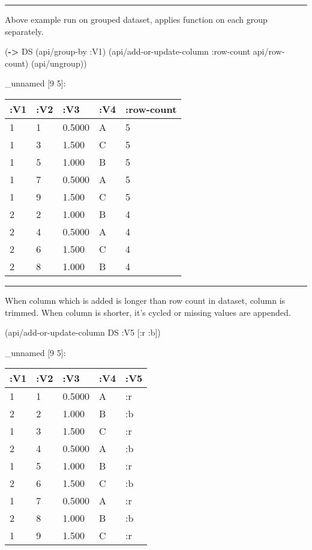 \documentclass[]{article}
\newenvironment{Shaded}{\begin{snugshade}}{\end{snugshade}}
\newcommand{\KeywordTok}[1]{\textcolor[rgb]{0.13,0.29,0.53}{\textbf{#1}}}
\newcommand{\AttributeTok}[1]{\textcolor[rgb]{0.77,0.63,0.00}{#1}}
\newcommand{\NormalTok}[1]{#1}
\begin{document}
\begin{center}\rule{0.5\linewidth}{0.5pt}\end{center}

Above example run on grouped dataset, applies function on each group
separately.

\begin{Shaded}
\begin{Highlighting}[]
\NormalTok{(}\KeywordTok{->}\NormalTok{ DS}
\NormalTok{    (api/group-by }\AttributeTok{:V1}\NormalTok{)}
\NormalTok{    (api/add-or-update-column }\AttributeTok{:row-count}\NormalTok{ api/row-count)}
\NormalTok{    (api/ungroup))}
\end{Highlighting}
\end{Shaded}

\_unnamed {[}9 5{]}:

\begin{longtable}[]{@{}lllll@{}}
\toprule
:V1 & :V2 & :V3 & :V4 & :row-count\tabularnewline
\midrule
\endhead
1 & 1 & 0.5000 & A & 5\tabularnewline
1 & 3 & 1.500 & C & 5\tabularnewline
1 & 5 & 1.000 & B & 5\tabularnewline
1 & 7 & 0.5000 & A & 5\tabularnewline
1 & 9 & 1.500 & C & 5\tabularnewline
2 & 2 & 1.000 & B & 4\tabularnewline
2 & 4 & 0.5000 & A & 4\tabularnewline
2 & 6 & 1.500 & C & 4\tabularnewline
2 & 8 & 1.000 & B & 4\tabularnewline
\bottomrule
\end{longtable}

\begin{center}\rule{0.5\linewidth}{0.5pt}\end{center}

When column which is added is longer than row count in dataset, column
is trimmed. When column is shorter, it's cycled or missing values are
appended.

\begin{Shaded}
\begin{Highlighting}[]
\NormalTok{(api/add-or-update-column DS }\AttributeTok{:V5}\NormalTok{ [}\AttributeTok{:r} \AttributeTok{:b}\NormalTok{])}
\end{Highlighting}
\end{Shaded}

\_unnamed {[}9 5{]}:

\begin{longtable}[]{@{}lllll@{}}
\toprule
:V1 & :V2 & :V3 & :V4 & :V5\tabularnewline
\midrule
\endhead
1 & 1 & 0.5000 & A & :r\tabularnewline
2 & 2 & 1.000 & B & :b\tabularnewline
1 & 3 & 1.500 & C & :r\tabularnewline
2 & 4 & 0.5000 & A & :b\tabularnewline
1 & 5 & 1.000 & B & :r\tabularnewline
2 & 6 & 1.500 & C & :b\tabularnewline
1 & 7 & 0.5000 & A & :r\tabularnewline
2 & 8 & 1.000 & B & :b\tabularnewline
1 & 9 & 1.500 & C & :r\tabularnewline
\bottomrule
\end{longtable}
\end{document}

